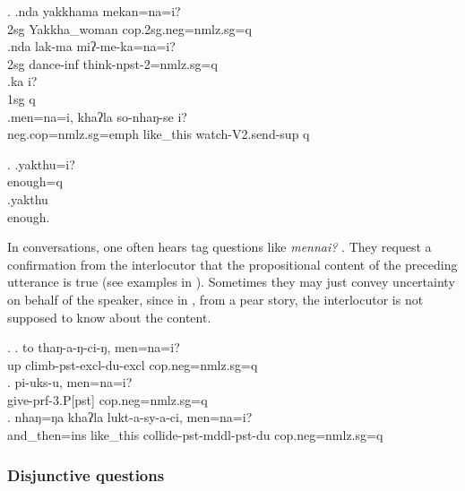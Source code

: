 
 \ex. \ag.nda yakkhama              mekan=na=i? \\
 {\sc 2sg} Yakkha\_woman {\sc cop.2sg.neg=nmlz.sg=q}\\
  
 \bg.nda lak-ma miʔ-me-ka=na=i?\\
 {\sc 2sg} dance{\sc -inf} think{\sc -npst-2=nmlz.sg=q}\\
 \bg.ka i?\\
 {\sc 1sg} {\sc q}\\
 \bg.men=na=i,                khaʔla   so-nhaŋ-se               i?\\
 {\sc neg.cop=nmlz.sg=emph} like\_this watch{\sc -V2.send-sup} {\sc q}\\
  
 
 \ex. \ag.yakthu=i? \\
 enough{\sc =q}\\
 \bg.yakthu\\
 enough.\\
 


In conversations, one often hears tag questions like \emph{mennai?} . They request a confirmation from the interlocutor that the propositional content of the preceding utterance is true (see examples in \Next). Sometimes they may just convey uncertainty on behalf of the speaker, since in \Next[c], from a pear story, the interlocutor is not supposed to know about the content. 
 
\ex. \ag.  to  thaŋ-a-ŋ-ci-ŋ,   men=na=i?\\
up climb{\sc -pst-excl-du-excl}  {\sc cop.neg=nmlz.sg=q}\\
 
\bg. pi-uks-u,            men=na=i?\\
give{\sc -prf-3.P[pst]}  {\sc cop.neg=nmlz.sg=q}\\
 
  \bg.    nhaŋ=ŋa      khaʔla   lukt-a-sy-a-ci,                            men=na=i?\\
  and\_then{\sc =ins} like\_this collide{\sc -pst-mddl-pst-du} {\sc cop.neg=nmlz.sg=q} \\
   
  
  
\subsubsection{Disjunctive questions}
 
